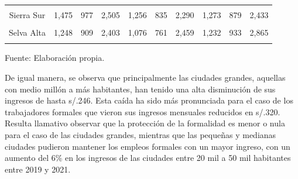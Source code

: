 \documentclass[
  letterpaper,
  12pt,
  oneside,
  spanish,
  doublespacing,
  headsepline,
  parskip]{MastersDoctoralThesis}
\begin{document}
\begin{table}[H]
\begin{tabular}{cccccccccc}
\cellcolor{gray!6}{Sierra Centro} & \cellcolor{gray!6}{1,339} & \cellcolor{gray!6}{845} & \cellcolor{gray!6}{2,454} & \cellcolor{gray!6}{1,276} & \cellcolor{gray!6}{706} & \cellcolor{gray!6}{2,694} & \cellcolor{gray!6}{1,209} & \cellcolor{gray!6}{804} & \cellcolor{gray!6}{2,588}\\
Sierra Sur & 1,475 & 977 & 2,505 & 1,256 & 835 & 2,290 & 1,273 & 879 & 2,433\\
\cellcolor{gray!6}{Selva Baja} & \cellcolor{gray!6}{1,343} & \cellcolor{gray!6}{909} & \cellcolor{gray!6}{2,476} & \cellcolor{gray!6}{1,205} & \cellcolor{gray!6}{870} & \cellcolor{gray!6}{2,400} & \cellcolor{gray!6}{1,327} & \cellcolor{gray!6}{999} & \cellcolor{gray!6}{2,731}\\
Selva Alta & 1,248 & 909 & 2,403 & 1,076 & 761 & 2,459 & 1,232 & 933 & 2,865\\
\addlinespace
\cellcolor{gray!6}{Lima Metropolitana} & \cellcolor{gray!6}{1,910} & \cellcolor{gray!6}{1,206} & \cellcolor{gray!6}{2,847} & \cellcolor{gray!6}{1,671} & \cellcolor{gray!6}{1,041} & \cellcolor{gray!6}{2,491} & \cellcolor{gray!6}{1,643} & \cellcolor{gray!6}{1,098} & \cellcolor{gray!6}{2,488}\\
\bottomrule
\end{tabular}
\endgroup{}
\end{table}

\noindent \small Fuente: Elaboración propia. \normalsize

De igual manera, se observa que principalmente las ciudades grandes,
aquellas con medio millón a más habitantes, han tenido una alta
disminución de sus ingresos de hasta s/.246. Esta caída ha sido más
pronunciada para el caso de los trabajadores formales que vieron sus
ingresos mensuales reducidos en s/.320. Resulta llamativo observar que
la protección de la formalidad es menor o nula para el caso de las
ciudades grandes, mientras que las pequeñas y medianas ciudades pudieron
mantener los empleos formales con un mayor ingreso, con un aumento del
6\% en los ingresos de las ciudades entre 20 mil a 50 mil habitantes
entre 2019 y 2021.
\end{document}
